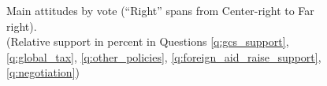 \begin{figure}[h!] 
    \caption[Main attitudes by vote]{Main attitudes by vote (``Right'' spans from Center-right to Far right). \\ (Relative support in percent in Questions \ref{q:gcs_support}, \ref{q:global_tax}, \ref{q:other_policies}, \ref{q:foreign_aid_raise_support}, \ref{q:negotiation})}\label{fig:main_by_vote}
\end{figure}





